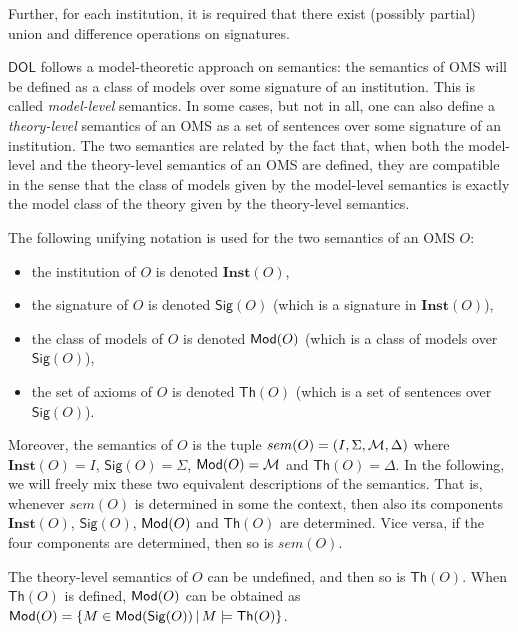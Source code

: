 \documentclass[10pt,fleqn,final]{scrreprt}
\newcommand{\Sig}{\mathsf{Sig}}
\renewcommand{\Th}{\mathsf{Th}}
\newcommand{\Inst}{\ensuremath{\mathbf{Inst}}}
\newcommand*{\DOL}{\ensuremath{\mathsf{DOL}}\xspace}
\newenvironment{definitions}[0]{\medskip }{}
\begin{document}
\begin{definitions}
Further,  for each institution, it is required that there exist (possibly partial) union
 and difference operations on signatures.

\medskip

\DOL follows a model-theoretic approach on semantics: the semantics of OMS will be defined as a class of models 
over some signature of an institution. This is called \emph{model-level}  semantics. In some cases, but not in all, one can also define
a \emph{theory-level} semantics of an OMS as a set of sentences over some signature of an institution. The two semantics are 
related by the fact that, when both the model-level and the theory-level semantics of an OMS are defined, they are compatible in the 
sense that the class of models given by the model-level semantics is exactly the model class of the theory given by the
theory-level semantics. 

 The following unifying notation is used for the two semantics of an OMS $O$:\begin{itemize}
 \item the institution of $O$ is denoted $\Inst(O)$,
  \item the signature of $O$ is denoted $\Sig(O)$ (which is a signature in $\Inst(O)$),
  \item the class of models of $O$ is denoted $\mathsf{Mod}(O)$ (which is a class of models over $\Sig(O)$),
  \item the set of axioms of $O$ is denoted $\Th(O)$ (which is a set of sentences over $\Sig(O)$).
\end{itemize}
\noindent Moreover, the semantics of $O$ is the tuple $sem(O) = (I, \Sigma, {\cal M},\Delta)$
where $\Inst(O) = I$, $\Sig(O) = \Sigma$, $\mathsf{Mod}(O) = {\cal M}$ and $\Th(O) = \Delta$.
In the following, we will freely mix these two equivalent descriptions of the semantics. That is, whenever $sem(O)$ is determined in some the context, then also its components $\Inst(O)$, $\Sig(O)$, $\mathsf{Mod}(O)$ and $\Th(O)$ are determined. Vice versa, if the four components are determined, then so is $sem(O)$.

The theory-level semantics of $O$ can be undefined, and then so is $\Th(O)$. When $\Th(O)$ is defined, $\mathsf{Mod}(O)$ can be obtained as $\Mod(O)=\{M\in\Mod(\Sig(O)) \,|\, M\models\Th(O)\}$.


\end{definitions}
\end{document}
